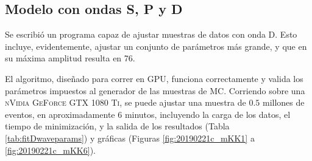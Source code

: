 


\subsection{Modelo con ondas S, P y D}

Se escribió
un programa capaz de ajustar muestras de datos con onda D. Esto incluye, evidentemente, ajustar un conjunto de parámetros más grande, y que en su máxima amplitud resulta en 76.

El algoritmo, diseñado para correr en GPU, funciona correctamente y valida los parámetros impuestos al generador de las muestras de MC. Corriendo sobre una \textsc{nVidia GeForce GTX 1080 Ti}, se puede ajustar una muestra de $0.5$ millones de eventos, en aproximadamente $6$ minutos, incluyendo la carga de los datos, el tiempo de minimización, y la salida de los resultados (Tabla \ref{tab:fitDwaveparams}) y gráficas (Figuras \ref{fig:20190221c_mKK1} a \ref{fig:20190221c_mKK6}).











